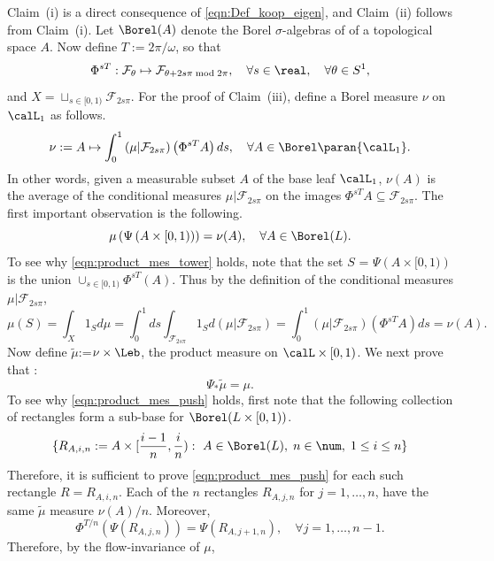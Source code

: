 \documentclass[12pt,oneside]{article}
\newcommand{\Fol}{\mathcal{F}}
\newcommand{\MesL}{\nu}
\newcommand{\Iso}{\Psi}
\begin{document}
Claim~(i) is a direct consequence of  \eqref{eqn:Def_koop_eigen}, and Claim~(ii) follows from Claim~(i). Let $\Borel(A)$ denote the Borel $\sigma$-algebras of of a topological space $A$.  Now define $T:= 2\pi/\omega$, so that
\[ \Phi^{sT} : \Fol_{\theta} \mapsto \Fol_{\theta+2s\pi \bmod 2\pi} , \quad \forall s\in\real, \quad \forall\theta\in S^1, \] 
%
and $X = \sqcup_{s\in [0,1)} \Fol_{2s\pi}$. For the proof of Claim~(iii), define a Borel measure $\MesL$ on $\calL_1$  as follows.
%
\[\MesL:= A\mapsto \int_0^1 \left(\mu|\Fol_{2s\pi}\right)\left(\Phi^{sT} A\right)ds, \quad \forall A\in \Borel \paran{ \calL_1 }.\]
%
In other words, given a measurable subset $A$ of the base leaf $\calL_1$, $\MesL(A)$ is the average of the conditional measures $\mu|\Fol_{2s\pi}$ on the images $\Phi^{sT} A \subseteq \Fol_{2s\pi}$. The first important observation is the following.
%
\begin{equation}\label{eqn:product_mes_tower}
\mu\left(\Iso\left(A\times [0,1)\right)\right) = \MesL(A), \quad \forall A\in \Borel(L). 
\end{equation}
%
To see why \eqref{eqn:product_mes_tower} holds, note that the set $S$ = $\Iso\left(A\times [0,1)\right)$ is the union $\cup_{s\in [0,1)} \Phi^{sT}(A)$. Thus by the definition of the conditional measures $\mu|\Fol_{2s\pi}$,  
%
\[\mu\left(S\right) = \int_X 1_Sd\mu = \int_0^1 ds\int_{\Fol_{2s\pi}} 1_S d(\mu|\Fol_{2s\pi}) = \int_0^1 \left(\mu|\Fol_{2s\pi}\right)\left(\Phi^{sT} A\right)ds = \MesL(A).\]
Now define $\tilde{\mu}$:=$\MesL\times\Leb$, the product measure on $\calL \times [0,1)$. We next prove that :
%
\begin{equation}\label{eqn:product_mes_push}
\Iso_{*}\tilde{\mu} = \mu. 
\end{equation}
%
To see why \eqref{eqn:product_mes_push} holds, first note that the following collection of rectangles form a sub-base for $\Borel(L\times [0,1))$.
\[ \{R_{A,i,n}:=A\times [\frac{i-1}{n},\frac{i}{n}) : \ A\in \Borel(L), \; n\in\num,\; 1\leq i \leq n \} \]
Therefore, it is sufficient to prove \eqref{eqn:product_mes_push} for each such rectangle $R= R_{A,i,n}$. Each of the $n$ rectangles $R_{A,j,n}$ for $j=1,\ldots,n$, have the same $\tilde{\mu}$ measure $\MesL(A)/n$. Moreover, 
 \[\Phi^{T/n} \left(\Iso(R_{A,j,n})\right) = \Iso(R_{A,j+1,n}),\quad \forall j=1,\ldots,n-1.\]
%
Therefore, by the flow-invariance of $\mu$, 
\end{document}
